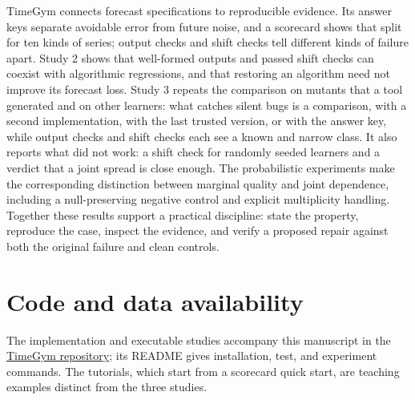 \documentclass[11pt,a4paper]{article}
\begin{document}
TimeGym connects forecast specifications to reproducible evidence. Its
answer keys separate avoidable error from future noise, and a scorecard
shows that split for ten kinds of series; output checks and shift checks
tell different kinds of failure apart. Study 2 shows that
well-formed outputs and passed shift checks can coexist with algorithmic
regressions, and that restoring an algorithm need not improve its forecast
loss. Study 3 repeats the comparison on mutants that a tool generated and
on other learners: what catches silent bugs is a comparison, with a second
implementation, with the last trusted version, or with the answer key,
while output checks and shift checks each see a known and narrow class.
It also reports what did not work: a shift check for randomly seeded
learners and a verdict that a joint spread is close enough. The probabilistic experiments make the corresponding distinction between
marginal quality and joint dependence, including a null-preserving
negative control and explicit multiplicity handling. Together these
results support a practical discipline: state the property, reproduce the
case, inspect the evidence, and verify a proposed repair against both the
original failure and clean controls.

\section*{Code and data availability}

The implementation and executable studies accompany this manuscript in the
\href{https://github.com/diogoseca/timegym}{TimeGym repository}; its README
gives installation, test, and experiment commands. The tutorials, which start from a scorecard quick start, are teaching examples distinct from the three studies.
\end{document}
